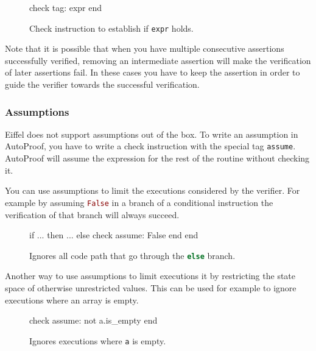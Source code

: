 \documentclass[a4paper,12pt]{article}
\newcommand{\AutoProof}{Auto\-Proof\xspace}
\newcommand{\e}[1]{\mbox{\lstinline[language=Eiffel]|#1|}}
\begin{document}
\begin{figure}
\begin{erunning}[numbers=none]
check tag: expr end
\end{erunning}
\hspace{0.5cm}
\caption*{Check instruction to establish if \e{expr} holds.}
\end{figure}

Note that it is possible that when you have multiple consecutive assertions successfully verified, removing an intermediate assertion will make the verification of later assertions fail. In these cases you have to keep the assertion in order to guide the verifier towards the successful verification.

\subsubsection*{Assumptions}

Eiffel does not support assumptions out of the box. To write an assumption in \AutoProof, you have to write a check instruction with the special tag \e{assume}. \AutoProof will assume the expression for the rest of the routine without checking it.

You can use assumptions to limit the executions considered by the verifier. For example by assuming \e{False} in a branch of a conditional instruction the verification of that branch will always succeed.

\begin{figure}
\begin{erunning}
if ... then
	...
else
	check assume: False end
end
\end{erunning}
\hspace{0.5cm}
\caption*{Ignores all code path that go through the \e{else} branch.}
\end{figure}

Another way to use assumptions to limit executions it by restricting the state space of otherwise unrestricted values. This can be used for example to ignore executions where an array is empty.

\begin{figure}
\begin{erunning}[numbers=none]
check assume: not a.is_empty end
\end{erunning}
\hspace{0.5cm}
\caption*{Ignores executions where \e{a} is empty.}
\end{figure}
\end{document}
